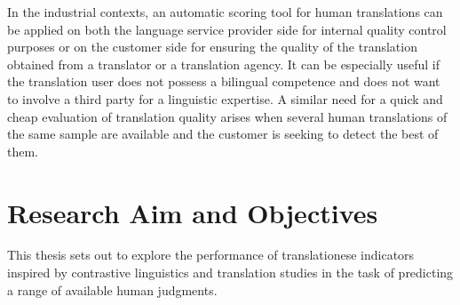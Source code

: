 In the industrial contexts, an automatic scoring tool for human translations can be applied on both the language service provider side for internal quality control purposes or on the customer side for ensuring the quality of the translation obtained from a translator or a translation agency. It can be especially useful if the translation user does not possess a bilingual competence and does not want to involve a third party for a linguistic expertise. A similar need for a quick and cheap evaluation of translation quality arises when several human translations of the same sample are available and the customer is seeking to detect the best of them. 

\section{\label{sec:task}Research Aim and Objectives}
This thesis sets out to explore the performance of translationese indicators inspired by contrastive linguistics and translation studies in the task of predicting a range of available human judgments.

